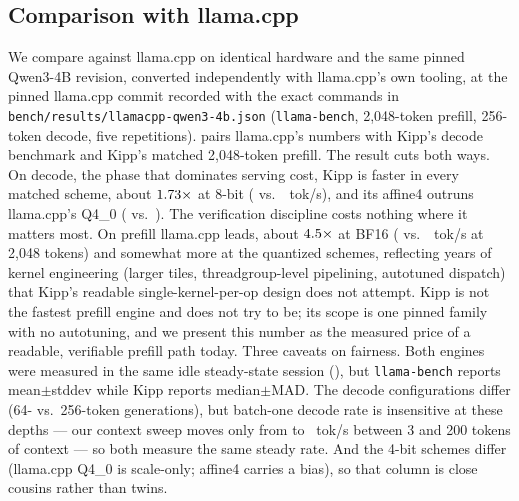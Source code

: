 \documentclass[sigconf,nonacm,screen]{acmart}
\newcommand{\code}[1]{\texttt{\small #1}}
\begin{document}
\subsection{Comparison with llama.cpp}
\label{sec:eval-llamacpp}
We compare against llama.cpp \citep{llamacpp2023gguf} on identical hardware
and the same pinned Qwen3-4B revision, converted independently with
llama.cpp's own tooling, at the pinned llama.cpp commit recorded with the
exact commands in \code{bench/results/llamacpp-qwen3-4b.json}
(\code{llama-bench}, 2{,}048-token prefill, 256-token decode, five
repetitions).  pairs llama.cpp's numbers with Kipp's
decode benchmark and Kipp's matched 2{,}048-token prefill. The result cuts
both ways. On decode, the phase that dominates serving cost, Kipp is faster
in every matched scheme, about $1.73\times$ at 8-bit
(\DecodeQEight{} vs.\ \LlamaDecodeQEight~tok/s), and its affine4 outruns
llama.cpp's Q4\_0 (\DecodeAffineFour{} vs.\ \LlamaDecodeQFour). The
verification discipline costs nothing where it matters most. On prefill
llama.cpp leads, about $4.5\times$ at
BF16 (\LlamaPrefillBF{} vs.\ \PrefillTwoKBF~tok/s at 2{,}048 tokens) and
somewhat more at the quantized schemes, reflecting years of kernel
engineering (larger tiles, threadgroup-level pipelining, autotuned
dispatch) that
Kipp's readable single-kernel-per-op design does not attempt. Kipp is not
the fastest prefill engine and does
not try to be; its scope is one pinned family with no autotuning, and we
present this number as the measured price of a readable, verifiable prefill
path today. Three caveats on fairness. Both engines were measured in the
same idle steady-state session (), but
\code{llama-bench} reports
mean$\pm$stddev while Kipp reports median$\pm$MAD. The
decode configurations differ (64- vs.\ 256-token generations), but
batch-one decode rate is insensitive at these depths --- our context sweep
moves only from \CtxDecodeShort{} to \CtxDecodeTwoHundred~tok/s between 3
and 200 tokens of context --- so both measure the same steady rate. And the 4-bit schemes
differ (llama.cpp Q4\_0 is scale-only; affine4
carries a bias), so that column is close cousins rather than twins.
\end{document}
